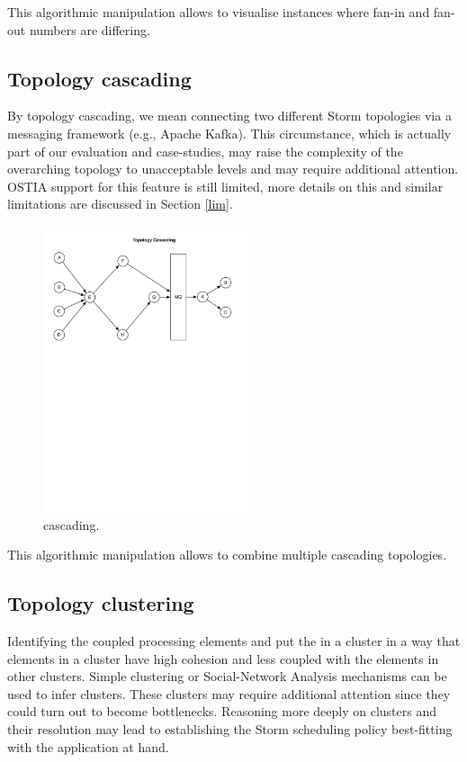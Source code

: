 This algorithmic manipulation allows to visualise instances where fan-in and fan-out numbers are differing.

\subsection{Topology cascading}

By topology cascading, we mean connecting two different Storm topologies via a messaging framework (e.g., Apache Kafka). This circumstance, which is actually part of our evaluation and case-studies, may raise the complexity of the overarching topology to unacceptable levels and may require additional attention. OSTIA support for this feature is still limited, more details on this and similar limitations are discussed in Section \ref{lim}.

\begin{figure}[H]
	\begin{center}
		\includegraphics[width=6cm]{images/cascading}
		\caption{cascading.}
		\label{fig:cascading}
	\end{center}
\end{figure}

This algorithmic manipulation allows to combine multiple cascading topologies.

\subsection{Topology clustering}
Identifying the coupled processing elements and put the in a cluster in a way that elements in a cluster have high cohesion and less coupled with the elements in other clusters. Simple clustering or Social-Network Analysis mechanisms can be used to infer clusters. These clusters may require additional attention since they could turn out to become bottlenecks. Reasoning more deeply on clusters and their resolution may lead to establishing the Storm scheduling policy best-fitting with the application at hand.

